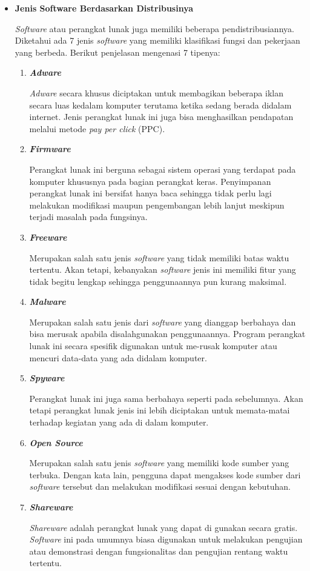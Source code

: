 \documentclass[12pt]{article}
\begin{document}
\begin{itemize}
        \item \textbf{Jenis Software Berdasarkan Distribusinya}
        \par
        \textit{Software} atau perangkat lunak juga memiliki beberapa pendistribusiannya. Diketahui ada 7 jenis \textit{software} yang memiliki klasifikasi fungsi dan pekerjaan yang berbeda. Berikut penjelasan mengenasi 7 tipenya:
        \begin{enumerate}
            \item \textbf{\textit{Adware}}
            \par
            \textit{Adware} secara khusus diciptakan untuk membagikan beberapa iklan secara luas kedalam komputer terutama ketika sedang berada didalam internet.  Jenis perangkat lunak ini juga bisa menghasilkan pendapatan melalui metode \textit{pay per click} (PPC).
            \item \textbf{\textit{Firmware}}
            \par
            Perangkat lunak ini berguna sebagai sistem operasi yang terdapat pada komputer khususnya pada bagian perangkat keras. Penyimpanan perangkat lunak ini bersifat hanya baca  sehingga tidak perlu lagi melakukan modifikasi maupun pengembangan lebih lanjut meskipun terjadi masalah pada fungsinya.
            \item \textbf{\textit{Freeware}}
            \par
            Merupakan salah satu jenis \textit{software} yang tidak memiliki batas waktu tertentu. Akan tetapi, kebanyakan \textit{software} jenis ini memiliki fitur yang tidak begitu lengkap sehingga penggunaannya pun kurang maksimal.
            \item \textbf{\textit{Malware}}
            \par
            Merupakan salah satu jenis dari \textit{software} yang dianggap berbahaya dan bisa merusak apabila disalahgunakan penggunaannya. Program perangkat lunak ini secara spesifik digunakan untuk me-rusak komputer atau mencuri data-data yang ada didalam komputer.
            \item \textbf{\textit{Spyware}}
            \par
            Perangkat lunak ini juga sama berbahaya seperti pada sebelumnya. Akan tetapi perangkat lunak jenis ini lebih diciptakan untuk memata-matai terhadap kegiatan yang ada di dalam komputer.
            \item \textbf{\textit{Open Source}}
            \par
            Merupakan salah satu jenis \textit{software} yang memiliki kode sumber yang terbuka. Dengan kata lain, pengguna dapat mengakses kode sumber dari \textit{software} tersebut dan melakukan modifikasi sesuai dengan kebutuhan.
            \item \textbf{\textit{Shareware}}
            \par
            \textit{Shareware} adalah perangkat lunak yang dapat di gunakan secara gratis. \textit{Software} ini pada umumnya biasa digunakan untuk melakukan pengujian atau demonstrasi dengan fungsionalitas dan pengujian rentang waktu tertentu.
        \end{enumerate}
    \end{itemize}
\end{document}
